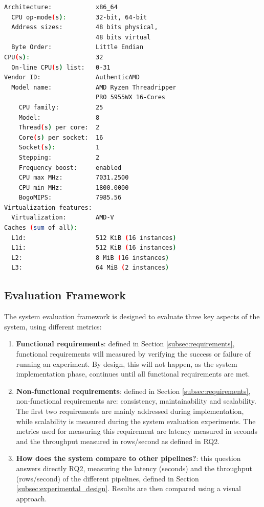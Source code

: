 \begin{lstlisting}[language=bash, caption={Output of a \textit{lscpu} bash command on the test environment.}, label={lst:cpu_snurran}, frame=tb]
Architecture:            x86_64
  CPU op-mode(s):        32-bit, 64-bit
  Address sizes:         48 bits physical, 
                         48 bits virtual
  Byte Order:            Little Endian
CPU(s):                  32
  On-line CPU(s) list:   0-31
Vendor ID:               AuthenticAMD
  Model name:            AMD Ryzen Threadripper 
                         PRO 5955WX 16-Cores
    CPU family:          25
    Model:               8
    Thread(s) per core:  2
    Core(s) per socket:  16
    Socket(s):           1
    Stepping:            2
    Frequency boost:     enabled
    CPU max MHz:         7031.2500
    CPU min MHz:         1800.0000
    BogoMIPS:            7985.56
Virtualization features: 
  Virtualization:        AMD-V
Caches (sum of all):     
  L1d:                   512 KiB (16 instances)
  L1i:                   512 KiB (16 instances)
  L2:                    8 MiB (16 instances)
  L3:                    64 MiB (2 instances)
\end{lstlisting}

\subsection{Evaluation Framework}
%

The system evaluation framework is designed to evaluate three key aspects of the system, using different metrics:
\begin{enumerate}
    \item \textbf{Functional requirements}: defined in Section \ref{subsec:requirements}, functional requirements will measured by verifying the success or failure of running an experiment. By design, this will not happen, as the system implementation phase, continues until all functional requirements are met.
    \item \textbf{Non-functional requirements}: defined in Section \ref{subsec:requirements}, non-functional requirements are: consistency, maintainability and scalability. The first two requirements are mainly addressed during implementation, while scalability is measured during the system evaluation experiments. The metrics used for measuring this requirement are latency measured in seconds and the throughput measured in rows/second as defined in RQ2.
    \item \textbf{How does the system compare to other pipelines?}: this question answers directly RQ2, measuring the latency (seconds) and the throughput (rows/second) of the different pipelines, defined in Section \ref{subsec:experimental_design}. Results are then compared using a visual approach.
\end{enumerate} 

